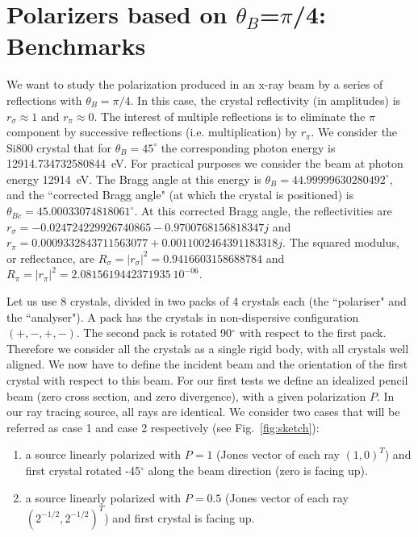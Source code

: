 \documentclass{iucr}
\begin{document}
\newpage
\section{Polarizers based on $\theta_B$=$\pi$/4: Benchmarks}\label{sec:polarizers45degBenchmark}

We want to study the polarization produced in an x-ray beam by a series of reflections with $\theta_B=\pi/4$. In this case, the crystal reflectivity (in amplitudes) is $r_\sigma \approx 1$ and $r_\pi \approx 0$. The interest of multiple reflections is to eliminate the $\pi$ component by successive reflections (i.e. multiplication) by $r_\pi$. We consider the Si800 crystal that for $\theta_B=45^{\circ}$ the corresponding photon energy is 12914.734732580844~eV. For practical purposes we consider the beam at photon energy 12914~eV. The Bragg angle at this energy is $\theta_B=44.99999630280492^{\circ}$, and the ``corrected Bragg angle" (at which the crystal is positioned) is $\theta_{Bc}=45.00033074818061^{\circ}$. At this corrected Bragg angle, the reflectivities are $r_\sigma=-0.024724229926740865-0.9700768156818347j$ and $r_\pi=0.0009332843711563077+0.0011002464391183318j$. The squared modulus, or reflectance, are $R_\sigma=|r_\sigma|^2=0.9416603158688784$ and 
$R_\pi=|r_\pi|^2=2.0815619442371935~10^{-06}$.

Let us use 8 crystals, divided in two packs of 4 crystals each (the ``polariser" and the ``analyser"). A pack has the crystals in non-dispersive configuration $(+,-,+,-)$. The second pack is rotated 90$^\circ$ with respect to the first pack. Therefore we consider all the crystals as a single rigid body, with all crystals well aligned. We now have to define the incident beam and the orientation of the first crystal with respect to this beam. For our first tests we define an idealized pencil beam (zero cross section, and zero divergence), with a given polarization $P$. In our ray tracing source, all rays are identical. We consider two cases that will be referred as case 1 and case 2 respectively (see Fig.~\ref{fig:sketch}):
\begin{enumerate}
    \item a source linearly polarized with $P=1$ (Jones vector of each ray $(1,0)^T$) and first crystal rotated -45$^\circ$ along the beam direction (zero is facing up).
    \item a source linearly polarized with $P=0.5$ (Jones vector of each ray $(2^{-1/2},2^{-1/2})^T$) and first crystal is facing up.    
\end{enumerate}
\end{document}
